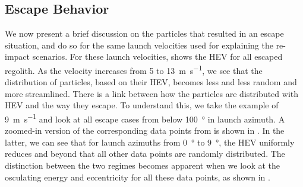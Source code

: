 \subsection{Escape Behavior}
\label{subsec:escape_behavior_noSP}
We now present a brief discussion on the particles that resulted in an escape situation, and do so for the same launch velocities used for explaining the re-impact scenarios. For these launch velocities,  shows the \gls{HEV} for all escaped regolith. As the velocity increases from 5 to \SI{13}{\metre\per\second}, we see that the distribution of particles, based on their \gls{HEV}, becomes less and less random and more streamlined. There is a link between how the particles are distributed with \gls{HEV} and the way they escape. To understand this, we take the example of \SI{9}{\metre\per\second} and look at all escape cases from below \SI{100}{\degree} in launch azimuth. A zoomed-in version of the corresponding data points from  is shown in . In the latter, we can see that for launch azimuths from \SI{0}{\degree} to \SI{9}{\degree}, the \gls{HEV} uniformly reduces and beyond that all other data points are randomly distributed. The distinction between the two regimes becomes apparent when we look at the osculating energy and eccentricity for all these data points, as shown in .
